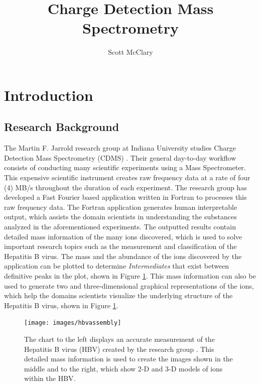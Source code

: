 \documentclass[9pt,twocolumn,twoside]{../../styles/osajnl}
\title{Charge Detection Mass Spectrometry}
\author[1,*]{Scott McClary}
\affil[1]{School of Informatics and Computing, Bloomington, IN 47408, U.S.A.}
\affil[*]{Corresponding authors: scmcclar@indiana.edu}
\begin{document}
\maketitle

\section{Introduction} \label{introduction}
\subsection{Research Background} \label{research-background}
The Martin F. Jarrold research group at Indiana University studies
Charge Detection Mass Spectrometry (CDMS) \cite{www-mfj}. Their
general day-to-day workflow consists of conducting many scientific
experiments using a Mass Spectrometer. This expensive scientific
instrument creates raw frequency data at a rate of four (4) MB/s
throughout the duration of each experiment. The research group has
developed a Fast Fourier based application written in Fortran to
processes this raw frequency data. The Fortran application generates
human interpretable output, which assists the domain scientists in
understanding the substances analyzed in the aforementioned
experiments. The outputted results contain detailed mass information
of the many ions discovered, which is used to solve important research
topics such as the measurement and classification of the Hepatitis B
virus. The mass and the abundance of the ions discovered by the
application can be plotted to determine \emph{Intermediates} that
exist between definitive peaks in the plot, shown in Figure
\ref{fig:hbvassembly}. This mass information can also be used to
generate two and three-dimensional graphical representations of the
ions, which help the domains scientists visualize the underlying
structure of the Hepatitis B virus, shown in Figure
\ref{fig:hbvassembly}.

\begin{figure}[h]
\centering
\texttt{[image: images/hbvassembly]}
\caption{The chart to the left displays an accurate measurement of the
  Hepatitis B virus (HBV) created by the research group
  \cite{chem14cdms}. This detailed mass information is used to create
  the images shown in the middle and to the right, which show 2-D and
  3-D models of ions within the HBV. \cite{chem14cdms}}
\label{fig:hbvassembly}
\end{figure}
\end{document}
